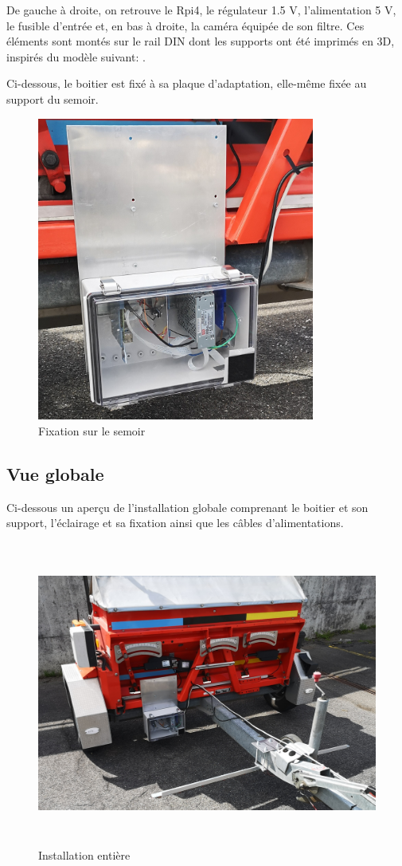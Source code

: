 De gauche à droite, on retrouve le Rpi4, le régulateur 1.5 V, l'alimentation 5 V, le fusible d'entrée et,
en bas à droite, la caméra équipée de son filtre. Ces éléments sont montés sur le rail DIN dont les supports ont été imprimés
en 3D, inspirés du modèle suivant: \cite{support_Rpi_3D}.

Ci-dessous, le boitier est fixé à sa plaque d'adaptation, elle-même fixée au support du semoir.

\begin{figure}[H]
    \centering
    \includegraphics[height=10cm]{assets/figures/boitier_adaptation.jpg}
    \caption{Fixation sur le semoir}
\end{figure}

\subsection{Vue globale}
Ci-dessous un aperçu de l'installation globale comprenant le boitier et son support, l'éclairage et sa fixation ainsi que les câbles d'alimentations.
\begin{figure}[H]
    \centering
    \includegraphics[height=10cm]{assets/figures/installation_globale.jpg}
    \caption{Installation entière}
\end{figure}